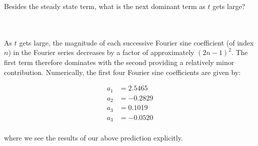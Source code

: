 Besides the steady state term, what is the next dominant term as $t$ gets large?

\begin{solution}\ \\\\
    As $t$ gets large, the magnitude of each successive Fourier sine coefficient (of index $n$) in the Fourier series 
    decreases by a factor of approximately $(2n - 1)^2$. The first term therefore dominates with the second providing a
    relatively minor contribution. Numerically, the first four Fourier sine coefficients are given by:

    \begin{align*}
        a_1 &= 2.5465  \\
        a_2 &= -0.2829 \\
        a_3 &= 0.1019  \\
        a_3 &= -0.0520 \\
    \end{align*}

    where we see the results of our above prediction explicitly.
    \ \\
\end{solution}